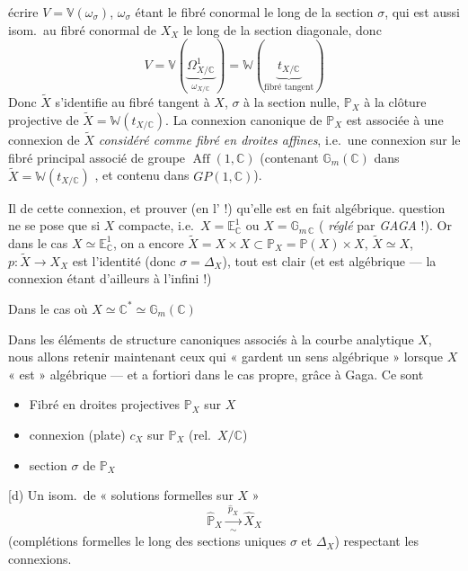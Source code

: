 \documentclass[11pt,a4paper]{article}
\begin{document}

écrire $V = \mathbb{V}(\omega_\sigma)$, $\omega_\sigma$ étant le fibré conormal le long de la section $\sigma$, qui est aussi isom.\ au fibré conormal de $X_X$ le long de la section diagonale, donc
\[
V = \mathbb{V}(\underbrace{\Omega^{1}_{X/\mathbb{C}}}_{\omega_{X/\mathbb{C}}}) = \mathbb{W}(\underbrace{t_{X/\mathbb{C}}}_{\text{fibré tangent}})
\]
Donc $\widetilde{X}$ s'identifie au fibré tangent à $X$, $\sigma$ à la section nulle, $\mathbb{P}_X$ à la clôture projective de $\widetilde{X} = \mathbb{W}(t_{X/\mathbb{C}})$. La connexion   canonique de $\mathbb{P}_X$ est associée à une connexion de $\widetilde{X}$ \emph{considéré comme fibré en droites affines}, i.e.\ une connexion sur le fibré principal associé de groupe $\operatorname{Aff}(1, \mathbb{C})$ (contenant $\mathbb{G}_m(\mathbb{C})$ dans $\widetilde{X} = \mathbb{W}(t_{X/\mathbb{C}})$ , et contenu dans $GP(1, \mathbb{C})$).

Il   de  cette connexion, et prouver (en l' !) qu'elle est en fait algébrique.  question ne se pose que si $X$  compacte, i.e.\ $X = \mathbb{E}^{1}_{\mathbb{C}}$ ou $X = \mathbb{G}_{m\,\mathbb{C}}$ ( \emph{réglé} par \emph{GAGA} !). Or dans le cas $X \simeq \mathbb{E}^{1}_{\mathbb{C}}$, on a encore $\widetilde{X} = X \times X \subset \mathbb{P}_X = \mathbb{P}(X) \times X$,  $\widetilde{X} \simeq X$, $p : \widetilde{X} \to X_X$ est l'identité (donc $\sigma = \Delta_X$), tout est clair (et  est algébrique — la connexion étant d'ailleurs  à l'infini !)

Dans le cas où $X \simeq \mathbb{C}^{*} \simeq \mathbb{G}_{m}(\mathbb{C})$


Dans les éléments de structure canoniques associés à la courbe analytique $X$, nous allons retenir maintenant ceux qui « gardent un sens algébrique » lorsque $X$ « est » algébrique — et a fortiori dans le cas propre, grâce à Gaga. Ce sont
\begin{itemize}
\item[a)] Fibré en droites projectives $\mathbb{P}_X$ sur $X$
\item[b)] connexion (plate) $c_X$ sur $\mathbb{P}_X$ (rel.\ $X/\mathbb{C}$)
\item[c)] section $\sigma$ de $\mathbb{P}_X$
\end{itemize}
[d) Un isom.\ de « solutions formelles sur $X$ »
\[
\widehat{\mathbb{P}}_X \xrightarrow[\ \sim\ ]{\ \hat{p}_X\ } \widehat{X}_X
\]
(complétions formelles le long des sections uniques $\sigma$ et $\Delta_X$) respectant les connexions.
\end{document}
